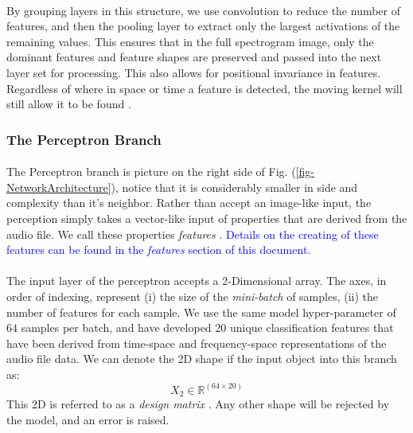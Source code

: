 \documentclass[12pt,letterpaper]{article}
\begin{document}
\paragraph*{}By grouping layers in this structure, we use convolution to reduce the number of features, and then the pooling layer to extract only the largest activations of the remaining values. This ensures that in the full spectrogram image, only the dominant features and feature shapes are preserved and passed into the next layer set for processing. This also allows for positional invariance in features. Regardless of where in space or time a feature is detected, the moving kernel will still allow it to be found \cite{Goodfellow,Loy}.


\subsubsection{The Perceptron Branch}

\paragraph*{} The Perceptron branch is picture on the right side of Fig. (\ref{fig-NetworkArchitecture}), notice that it is considerably smaller in side and complexity than it's neighbor. Rather than accept an image-like input, the perception simply takes a vector-like input of properties that are derived from the audio file. We call these properties \textit{features} \cite{Geron,Kahn,Serizel}. \textcolor{blue}{Details on the creating of these features can be found in the \textit{features} section of this document.}

\paragraph*{}The input layer of the perceptron accepts a 2-Dimensional array. The axes, in order of indexing, represent (i) the size of the \textit{mini-batch} of samples, (ii) the number of features for each sample. We use the same model hyper-parameter of $64$ samples per batch, and have developed $20$ unique classification features that have been derived from time-space and frequency-space representations of the audio file data. We can denote the 2D shape if the input object into this branch as:
\begin{equation}
\label{eqn-shapeX2}
X_2 \in \mathbb{R}^{(64 \times 20)}
\end{equation}
This 2D is referred to as a \textit{design matrix} \cite{James,Loy}. Any other shape will be rejected by the model, and an error is raised.
\end{document}
